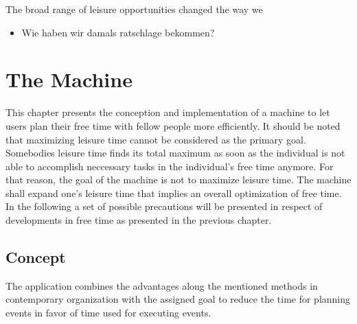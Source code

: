 \documentclass[12pt,numbers=noenddot,parskip,bibliography=totocnumbered,listof=totocnumbered]{scrreprt}
\begin{document}
The broad range of leisure opportunities changed the way we

\begin{itemize} 
	\item Wie haben wir damals ratschlage bekommen?
	\end{itemize} 


\chapter{The Machine}
This chapter presents the conception and implementation of a machine to let users plan their free time with fellow people more efficiently. It should be noted that maximizing leisure time cannot be considered as the primary goal. Somebodies leisure time finds its total maximum as soon as the individual is not able to accomplish neccessary tasks in the individual's free time anymore. For that reason, the goal of the machine is not to maximize leisure time. The machine shall expand one's leisure time that implies an overall optimization of free time. In the following a set of possible precautions will be presented in respect of developments in free time as presented in the previous chapter.

\section{Concept}
The application combines the advantages along the mentioned methods in contemporary organization with the assigned goal to reduce the time for planning events in favor of time used for executing events.



\end{document}
